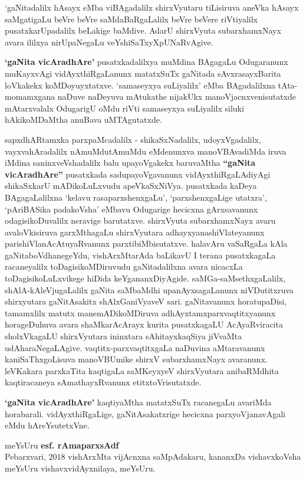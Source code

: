 \bigskip

`gaNitadalilx hAsayx eMba viBAgadalilx shirxVyutaru tiLisiruva aneVka hAsayx saMgatigaLu beVre beVre saMdaBaRgaLalilx beVre beVere riVtiyalilx pusatxkarUpadalilx beLakige baMdive. AdarU shirxVyuta subarxhamxNayx avara ililxya nirUpaNegaLu veYshiSaTxyXpUNaRvAgive.

\bigskip

{\bf `gaNita vicAradhAre'} pusatxkadalilxya muMdina BAgagaLu Odugaranunx muKayxvAgi vidAyxthiRgaLanunx matatxSuTx gaNitada sAvxrasayxBarita loVkakekx koMDoyuyxtatxve. `samaseyxya suLiyalilx' eMba BAgadalilxna tAta-momamxgana naDuve naDeyuva mAtukathe nijakUkx manoVjacnxvenisutatxde mAtarxvalalx OdugarigU oMdu riVti samaseyxya suLiyalilx siluki hAkikoMDaMtha anuBava uMTAgutatxde.

\bigskip

sapxdhARtamxka parxpaMcadalilx - shikaSxNadalilx, udoyxVgadalilx, vayxvahAradalilx nAmuMdu\break tAmuMdu eMdenunxva manoVBAvadiMda iruva iMdina saninxveVshadalilx balu upa\break\-yoVgakekx baruvaMtha {\bf ``gaNita vicAradhAre''} pusatxkada sadupayoVgavanunx vidAyxthiRgaLAdi\-yAgi shikaSxkarU mADikoLuLxvudu apeVkaSxNiVya. pusatxkada kaDeya BAgagaLalilxna `kelavu rasaparxshenxgaLu', `parxshenxgaLige utatxra', `pAriBASika padakoVsha' eMbavu Odugarige hecicxna gArxsa\-vanunx odagisikoDuvalilx neravige barutatxve. shirxVyuta subarxhamxNayx avaru avaloVkisiruva garxMthagaLu shirxVyutara adhayxyanashiVlateyanunx parishiVlanAcAtuyaRvanunx parxtibiMbisu\-tatxve. halavAru vaSaRgaLa kAla gaNitaboVdhanegeYdu, vishArxMtarAda baLikavU I terana pusatxkagaLa racaneyalilx toDagisikoMDiruvudu gaNitadalilxna avara nicacxLa toDagisikoLuLxvikege hiDida keYgananxDiyAgide. saMGa-saMsethxgaLalilx, shAlA-kAleVjugaLalilx gaNita saMbaMdhi upanAyxsagaLanunx niVDutitxruva shirxyutara gaNitAsakitx shAlxGaniVyaveV sari. gaNitavanunx horatupaDisi, tamamxlilx matutx manemADikoMDiruva adhAyxtamxparxvaqtitxyanunx horageDuhuva avara shaMkarAcArayx kurita pusatxkagaLU AcAyaRviracita sholxVkagaLU shirxVyutara ininxtara sAhitayxkaqSiya jiVvaMta udAharaNegaLAgive. vaqtitx-parxvaqtitxgaLa naDuvina aMtaravanunx kaniSaThxgoLisuva manoVBUmike shirxV subarxhamxNayx avaranunx. leVKakara parxkaTita kaqtigaLa saMKeyxyeV shirxVyutara anibaRMdhita kaqtiracaneya sAmathayxRvanunx etitxtoVrisutatxde.

\bigskip

{\bf `gaNita vicAradhAre'} kaqtiyaMtha matatxSuTx racanegaLu avariMda horabarali. vidAyxthiRgaLige, gaNitAsakatxrige hecicxna parxyoVjanavAgali eMdu hAreYsutetxVne.

\bigskip

\begin{flushright}
meYsUru \hfill{\bf esf. rAmaparxsAdf}\hfill\\
Pebarxvari, $2018$ \hfill{vishArxMta vijAcnxna saMpAdakaru, kananxDa vishavxkoVsha}\\
\hfill{meYsUru vishavxvidAyxnilaya, meYsUru.}\\
\end{flushright}
